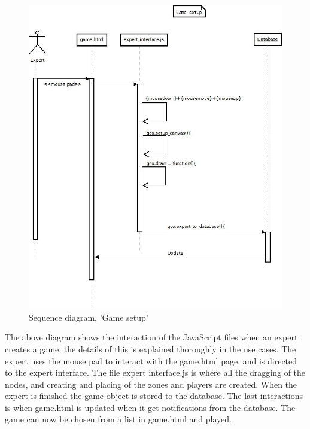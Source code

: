 \begin{figure}[H]
  \centering
    \includegraphics[width=1.0\textwidth]{img/gamesetupsekvens.jpeg}
  \caption{Sequence diagram, 'Game setup'} 
  \label{fig:gamesetupseq}
\end{figure}

The above diagram shows the interaction of the JavaScript files when an expert creates a game, the details of this is explained thoroughly in the use cases. The expert uses the mouse pad to interact with the game.html page, and is directed to the expert interface. The file expert interface.js is where all the dragging of the nodes, and creating and placing of the zones and players are created. When the expert is finished the game object is stored to the database. The last interactions is when game.html is updated when it get notifications from the database. The game can now be chosen from a list in game.html and played. \\

